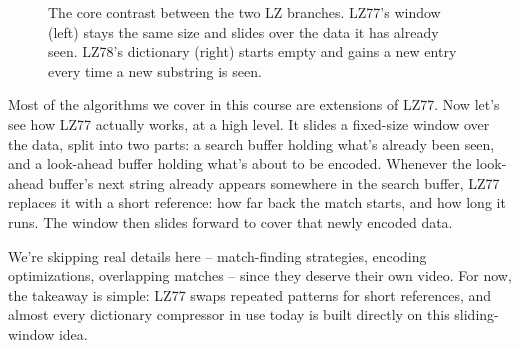 \documentclass[11pt]{article}
\begin{document}
\begin{figure}[H]
\centering
{}
\caption{The core contrast between the two LZ branches.
LZ77's window (left) stays the same size and slides over the data it has
already seen. LZ78's dictionary (right) starts empty and gains a new entry
every time a new substring is seen.}
\label{fig:lz77-vs-lz78}
\end{figure}

Most of the algorithms we cover in this course are extensions of LZ77.
Now let's see how LZ77 actually works, at a high level. It slides a
fixed-size window over the data, split into two parts: a search buffer
holding what's already been seen, and a look-ahead buffer holding what's
about to be encoded. Whenever the look-ahead buffer's next string already
appears somewhere in the search buffer, LZ77 replaces it with a short
reference: how far back the match starts, and how long it runs. The window
then slides forward to cover that newly encoded data.

We're skipping real details here -- match-finding strategies, encoding
optimizations, overlapping matches -- since they deserve their own video.
For now, the takeaway is simple: LZ77 swaps repeated patterns for short
references, and almost every dictionary compressor in use today is built
directly on this sliding-window idea.
\end{document}
